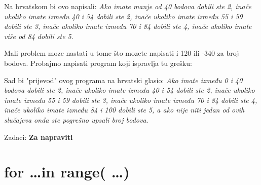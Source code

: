 Na hrvatskom bi ovo napisali: \emph{Ako imate manje od 40 bodova dobili ste 2, inače ukoliko imate
između 40 i 54 dobili ste 2, inače ukoliko imate između 55 i 59 dobili ste 3, inače ukoliko imate
između 70 i 84 dobili ste 4, inače ukoliko imate više od 84 dobili ste 5}.

Mali problem moze nastati u tome što mozete napisati i 120 ili -340 za broj bodova. Probajmo
napisati program koji ispravlja tu grešku:


Sad bi "prijevod" ovog programa na hrvatski glasio: \emph{Ako imate
između 0 i 40 bodova dobili ste 2, inače ukoliko imate između
40 i 54 dobili ste 2, inače ukoliko imate između 55 i 59 dobili
ste 3, inače ukoliko imate između 70 i 84 dobili ste 4, inače
ukoliko imate između 84 i 100 dobili ste 5, a ako nije niti jedan
od ovih slučajeva onda ste pogrešno upsali broj bodova}.

Zadaci: \textbf{Za napraviti}

\section{for \dots in range( \dots )}


